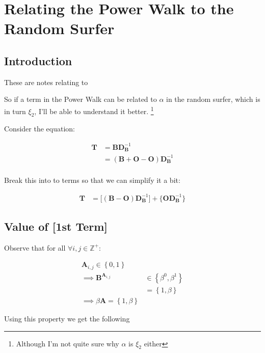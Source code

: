 \documentclass[11pt]{article}
\begin{document}
\section{Relating the Power Walk to the Random Surfer}
\label{relating-terms-in-power-walk-to-random-surfer}
\subsection{Introduction}
\label{sec:org3952a5e}
These are notes relating to \cite[]{parkPowerWalkRevisiting2013}

So if a term in the Power Walk can be related to \(\alpha\) in the random
surfer, which is in turn \(\xi_2\), I'll be able to understand it better. \footnote{Although I'm not quite sure why \(\alpha\) is \(\xi_{2}\) either}

Consider the equation:


\begin{align*}
\mathbf{T}&= \mathbf{B}\mathbf{D}_{\mathbf{B}}^{- 1} \\
&= \left( \mathbf{B}+  \mathbf{O} - \mathbf{O} \right) \mathbf{D}_{\mathbf{B}}^{- 1} \\
\end{align*}


Break this into to terms so that we can simplify it a bit:


\begin{align*}
    \mathbf{T} &= \Bigg[ \left( \mathbf{B}- \mathbf{O} \right)\mathbf{D}_{\mathbf{B}}^{- 1} \Bigg] + \Bigg\{  \mathbf{O}\mathbf{D}_{\mathbf{B}}^{- 1} \Bigg\}
\end{align*}
\subsection{Value of [1st Term]}
\label{value-of-1st-term}
Observe that for all \(\forall i,j\in \mathbb{Z}^+\):


\begin{align*}
\mathbf{A}_{i, j} \in \left\{0, 1\right\} \\
\implies  \mathbf{B}^{\mathbf{A}_{i, j}} &\in \left\{\beta^0, \beta^1\right\} \\
                     &= \left\{1, \beta \right\}  \\
                      \implies  \beta \mathbf{A} = \left\{1, \beta \right\}
\end{align*}


Using this property we get the following
\end{document}
